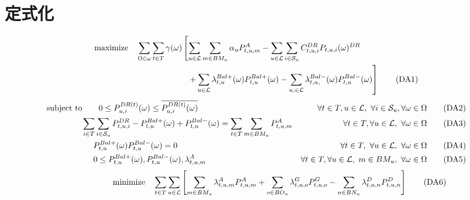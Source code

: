 \documentclass[a4j,10.5pt,fleqn]{jarticle}
\begin{document}
\section{定式化}
\begin{align}
&{\rm maximize}\quad \sum_{\Omega\in \omega}\sum_{t \in T} \gamma(\omega)\left[\sum_{u\in \mathcal{L}} \sum_{m\in BM_u}\alpha_{u} P_{t,u,m}^{A}-\sum_{u\in \mathcal{L}}\sum_{i\in \mathcal{S}_u}C_{t,u,i}^{DR}P_{t,u,i}(\omega)^{DR}\right.\notag\\
&\hspace{40mm}\left.+\sum_{u\in \mathcal{L}}\lambda_{t,u}^{Bal+}(\omega)P_{t,u}^{Bal+}(\omega)-\sum_{u,\in \mathcal{L}}\lambda_{t,u,}^{Bal-}(\omega)P_{t,u}^{Bal-}(\omega)\right]\label{DA1}\tag{DA1}
\end{align}
\begin{align}
&{\rm subject\,\,to}\qquad 0\le P_{u,i}^{DR(t)}(\omega)\le \overline{P_{u,i}^{DR(t)}(\omega)}& \forall t\in T,u\in\mathcal{L},\ \forall i\in\mathcal{S}_u, \forall \omega \in \Omega \label{DA2}\tag{DA2}\\
&\hspace{15mm}\sum_{i\in T}\sum_{i\in \mathcal{S}_u}P_{t,u,i}^{DR}-P_{t,u}^{Bal+}(\omega)+P_{t,u}^{Bal-}(\omega)=\sum_{t \in T}\sum_{m\in BM_u}P_{t,u,m}^{A}& \forall t \in T, \forall u\in\mathcal{L},\ \forall \omega \in \Omega \label{DA3}\tag{DA3}\\
&\hspace{20mm}P_{t,u}^{Bal+}(\omega)P_{t,u}^{Bal-}(\omega)=0&\forall t\in T,\ \forall u\in\mathcal{L},\ \forall \omega \in \Omega \label{DA4}\tag{DA4}\\
&\hspace{20mm}0\le P_{t,u}^{Bal+}(\omega),P_{t,u}^{Bal-}(\omega),\lambda_{t,u,m}^{A}& \forall t\in T,\forall u\in\mathcal{L},\ m\in BM_u,\ \forall \omega \in \Omega\label{DA5}\tag{DA5}
\end{align}
\begin{align}
\hspace{20mm}{\rm minimize}\quad\sum_{t \in T}\sum_{u\in \mathcal{L}}\left[\sum_{m\in BM_u}\lambda^{A}_{t,u,m}P^{A}_{t,u,m}+\sum_{o\in BO_u}\lambda^{G}_{t,u,o}P^{G}_{t,u,o}-\sum_{n\in BN_u}\lambda^{D}_{t,u,n}P^{D}_{t,u,n}\right]\label{DA6}\tag{DA6}
\end{align}
\end{document}
